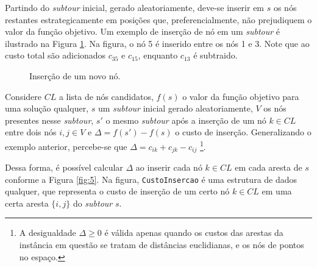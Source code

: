 Partindo do \textit{subtour} inicial, gerado aleatoriamente, deve-se inserir em \(s\) os nós restantes estrategicamente em posições que, preferencialmente, não prejudiquem o valor da função objetivo. Um exemplo de inserção de nó em um \textit{subtour} é ilustrado na Figura \ref{fig:4}. Na figura, o nó 5 é inserido entre os nós 1 e 3. Note que ao custo total são adicionados \(c_{35}\) e \(c_{15}\), enquanto \(c_{13}\) é subtraido.

\begin{figure}[!htbp]
    \centering
    \caption{Inserção de um novo nó.}
    \label{fig:4}
\end{figure}

Considere \(CL\) a lista de nós candidatos, \(f(s)\) o valor da função objetivo para uma solução qualquer, \(s\) um \textit{subtour} inicial gerado aleatoriamente, \(V\) os nós presentes nesse \textit{subtour}, \(s'\) o mesmo \textit{subtour} após a inserção de um nó \(k \in CL\) entre dois nós \(i,j \in V\) e  \(\Delta = f(s') - f(s)\) o custo de inserção. Generalizando o exemplo anterior, percebe-se que \(\Delta = c_{ik} + c_{jk} - c_{ij}\) \footnote{A desigualdade \(\Delta \geq 0\) é válida apenas quando os custos das arestas da instância em questão se tratam de distâncias euclidianas, e os nós de pontos no espaço.}.

Dessa forma, é possível calcular \(\Delta\) ao inserir cada nó \(k \in CL\) em cada aresta de \(s\) conforme a Figura \ref{fig:5}. Na figura, \texttt{CustoInsercao} é uma estrutura de dados qualquer, que representa o custo de inserção de um certo nó \(k \in CL\) em uma certa aresta \(\{i,j\}\) do \textit{subtour} \(s\).

